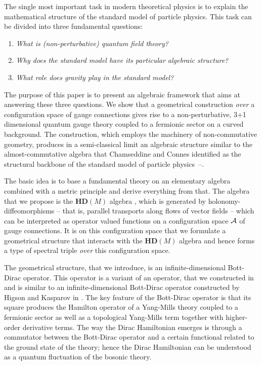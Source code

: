 \documentclass[12pt]{article}
\def\ca{{\cal A}}
\begin{document}
The single most important task in modern theoretical physics is to explain the mathematical structure of the standard model of particle physics.
This task can be divided into three fundamental questions:
\begin{enumerate}
\item
{\it What is (non-perturbative) quantum field theory?}
\item
{\it Why does the standard model have its particular algebraic structure?} 
\item
{\it What role does gravity play in the standard model?}
\end{enumerate}
The purpose of this paper is to present an algebraic framework that aims at answering these three questions. We show that a geometrical construction {\it over} a configuration space of gauge connections gives rise to a non-perturbative, 3+1 dimensional quantum gauge theory coupled to a fermionic sector on a curved background. The construction, which employs the machinery of non-commutative geometry, produces in a semi-classical limit an algebraic structure similar to the almost-commutative algebra that Chamseddine and Connes identified as the structural backbone of the standard model of particle physics \cite{Connes:1996gi}\,--\!\cite{Chamseddine:2012sw}.







The basic idea is to base a fundamental theory on an elementary algebra combined with a metric principle and derive everything from that.  The algebra that we propose is the $\mathbf{HD}(M)$ algebra \cite{Aastrup:2012vq,AGnew}, which is generated by holonomy-diffeomorphisms -- that is, parallel transports along flows of vector fields -- which can be interpreted as operator valued functions on a configuration space $\ca$ of gauge connections. It is on this configuration space that we formulate a geometrical structure that interacts with the $\mathbf{HD}(M)$ algebra and hence forms a type of spectral triple {\it over} this configuration space.

The geometrical structure, that we introduce, is an infinite-dimensional Bott-Dirac operator. This operator is a variant of an operator, that we constructed in \cite{Aastrup:2019yui,Aastrup:2017atr} and is similar to an infinite-dimensional Bott-Dirac operator constructed by Higson and Kasparov in \cite{Higson}. 
The key feature of the Bott-Dirac operator is that its square produces the Hamilton operator of a Yang-Mills theory coupled to a fermionic sector as well as a topological Yang-Mills term together with higher-order derivative terms. The way the Dirac Hamiltonian emerges is through a commutator between the Bott-Dirac operator and a certain functional related to the ground state of the theory; hence the Dirac Hamiltonian can be understood as a quantum fluctuation of the bosonic theory. 
\end{document}
